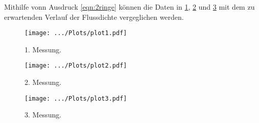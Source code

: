 Mithilfe vonn Ausdruck \eqref{eqn:2ringe} können die Daten in \ref{fig:1mess}, \ref{fig:2mess} und \ref{fig:3mess}  mit dem zu erwartenden Verlauf der Flussdichte vergeglichen werden.
\begin{figure}
    \centering
    \texttt{[image: .../Plots/plot1.pdf]}
    \caption{1. Messung.}
    \label{fig:1mess}
\end{figure}
\begin{figure}
    \centering
    \texttt{[image: .../Plots/plot2.pdf]}
    \caption{2. Messung.}
    \label{fig:2mess}
\end{figure}
\begin{figure}
    \centering
    \texttt{[image: .../Plots/plot3.pdf]}
    \caption{3. Messung.}
    \label{fig:3mess}
\end{figure}
\pagebreak

